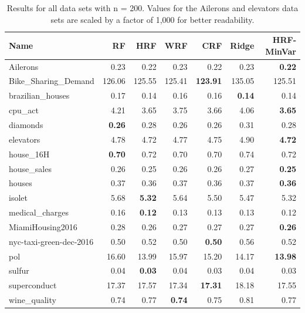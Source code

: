 \begin{table}[ht]
\centering
\begingroup\scriptsize
\begin{tabular}{lrrrrrr}
  \hline
\textbf{ Name } & \textbf{ RF } & \textbf{ HRF } & \textbf{ WRF } & \textbf{ CRF } & \textbf{ Ridge } & \textbf{ HRF-MinVar } \\ 
  \hline
Ailerons & 0.23 & 0.22 & 0.23 & 0.22 & 0.23 & \textbf{0.22} \\ 
  Bike\_Sharing\_Demand & 126.06 & 125.55 & 125.41 & \textbf{123.91} & 135.05 & 125.51 \\ 
  brazilian\_houses & 0.17 & 0.14 & 0.16 & 0.16 & \textbf{0.14} & 0.14 \\ 
  cpu\_act & 4.21 & 3.65 & 3.75 & 3.66 & 4.06 & \textbf{3.65} \\ 
  diamonds & \textbf{0.26} & 0.28 & 0.26 & 0.26 & 0.31 & 0.28 \\ 
  elevators & 4.78 & 4.72 & 4.77 & 4.75 & 4.90 & \textbf{4.72} \\ 
  house\_16H & \textbf{0.70} & 0.72 & 0.70 & 0.70 & 0.74 & 0.72 \\ 
  house\_sales & 0.26 & 0.25 & 0.26 & 0.26 & 0.27 & \textbf{0.25} \\ 
  houses & 0.37 & 0.36 & 0.37 & 0.36 & 0.37 & \textbf{0.36} \\ 
  isolet & 5.68 & \textbf{5.32} & 5.64 & 5.50 & 5.47 & 5.32 \\ 
  medical\_charges & 0.16 & \textbf{0.12} & 0.13 & 0.13 & 0.13 & 0.12 \\ 
  MiamiHousing2016 & 0.28 & 0.26 & 0.27 & 0.27 & 0.27 & \textbf{0.26} \\ 
  nyc-taxi-green-dec-2016 & 0.50 & 0.52 & 0.50 & \textbf{0.50} & 0.56 & 0.52 \\ 
  pol & 16.60 & 13.99 & 15.97 & 15.20 & 14.17 & \textbf{13.98} \\ 
  sulfur & 0.04 & \textbf{0.03} & 0.04 & 0.03 & 0.04 & 0.03 \\ 
  superconduct & 17.37 & 17.57 & 17.34 & \textbf{17.31} & 18.18 & 17.55 \\ 
  wine\_quality & 0.74 & 0.77 & \textbf{0.74} & 0.75 & 0.81 & 0.77 \\ 
   \hline
\end{tabular}
\endgroup
\caption{Results for all data sets with n = 200. Values for the Ailerons and elevators data sets are scaled by a factor of 1,000 for better readability.} 
\end{table}
